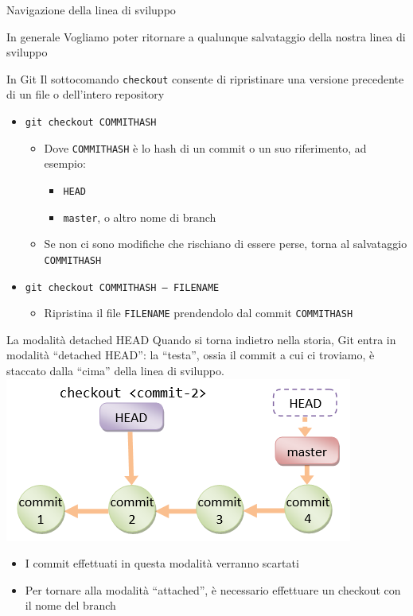\documentclass[presentation]{beamer}
\begin{document}
\begin{frame}{Navigazione della linea di sviluppo}
	\begin{block}{In generale}
		Vogliamo poter ritornare a qualunque salvataggio della nostra linea di sviluppo
	\end{block}
	\begin{block}{In Git}
		Il sottocomando \texttt{checkout} consente di ripristinare una versione precedente di un file o dell'intero repository
		\begin{itemize}
			\item \texttt{git checkout COMMITHASH}
			\begin{itemize}
				\item Dove \texttt{COMMITHASH} è lo hash di un commit o un suo riferimento, ad esempio:
				\begin{itemize}
					\item \texttt{HEAD}
					\item \texttt{master}, o altro nome di branch
				\end{itemize}
				\item Se non ci sono modifiche che rischiano di essere perse, torna al salvataggio \texttt{COMMITHASH}
			\end{itemize}
			\item \texttt{git checkout COMMITHASH -- FILENAME}
			\begin{itemize}
				\item Ripristina il file \texttt{FILENAME} prendendolo dal commit \texttt{COMMITHASH}
			\end{itemize}
		\end{itemize}
	\end{block}
	\begin{block}{La modalità detached HEAD}
		Quando si torna indietro nella storia, Git entra in modalità ``detached HEAD'': la ``testa'', ossia il commit a cui ci troviamo, è staccato dalla ``cima'' della linea di sviluppo.\\
		\centering
		\includegraphics[width=.4\textwidth]{img/detached}
		\begin{itemize}
			\item I commit effettuati in questa modalità verranno scartati
			\item Per tornare alla modalità ``attached'', è necessario effettuare un checkout con il nome del branch

\end{itemize}
\end{block}
\end{frame}
\end{document}

